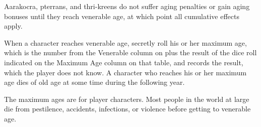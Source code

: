 

Aarakocra, pterrans, and thri-kreens do not suffer aging penalties or gain aging bonuses until they reach venerable age, at which point all cumulative effects apply.

When a character reaches venerable age, secretly roll his or her maximum age, which is the number from the Venerable column on  plus the result of the dice roll indicated on the Maximum Age column on that table, and records the result, which the player does not know. A character who reaches his or her maximum age dies of old age at some time during the following year.

The maximum ages are for player characters. Most people in the world at large die from pestilence, accidents, infections, or violence before getting to venerable age.

